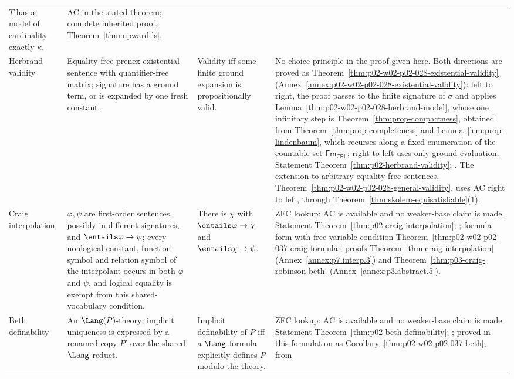 \begin{landscape}
\begin{longtable}{@{}p{1.15in}p{2.15in}p{2.25in}p{1.65in}@{}}
\(T\) has a model of cardinality exactly \(\kappa\). &
AC in the stated theorem; complete inherited proof,
Theorem~\ref{thm:upward-ls}. \\
\addlinespace
Herbrand validity &
Equality-free prenex existential sentence with quantifier-free matrix;
signature has a ground term, or is expanded by one fresh constant. &
Validity iff some finite ground expansion is propositionally valid. &
No choice principle in the proof given here.  Both directions are proved as
Theorem~\ref{thm:p02-w02-p02-028-existential-validity}
(Annex~\ref{annex:p02-w02-p02-028-existential-validity}): left to right, the
proof passes to the finite signature of \(\sigma\) and applies
Lemma~\ref{thm:p02-w02-p02-028-herbrand-model}, whose one infinitary step is
Theorem~\ref{thm:prop-compactness}, obtained from
Theorem~\ref{thm:prop-completeness} and Lemma~\ref{lem:prop-lindenbaum},
which recurses along a fixed enumeration of the countable set
\(\mathsf{Fm}_{\mathsf{CPL}}\); right to left uses only ground evaluation.
Statement Theorem~\ref{thm:p02-herbrand-validity};
\cite{AfshariEnqvistLeigh2025}.  The extension to arbitrary equality-free
sentences, Theorem~\ref{thm:p02-w02-p02-028-general-validity}, uses AC right
to left, through Theorem~\ref{thm:skolem-equisatisfiable}(1). \\
\addlinespace
Craig interpolation &
\(\varphi,\psi\) are first-order sentences, possibly in different
signatures, and \(\entails\varphi\to\psi\); every nonlogical constant,
function symbol and relation symbol of the interpolant occurs in both
\(\varphi\) and \(\psi\), and logical equality is exempt from this
shared-vocabulary condition. &
There is \(\chi\) with \(\entails\varphi\to\chi\) and
\(\entails\chi\to\psi\). &
ZFC lookup: AC is available and no weaker-base claim is made.  Statement
Theorem~\ref{thm:p02-craig-interpolation}; \cite{Craig1957}; formula form
with free-variable condition
Theorem~\ref{thm:p02-w02-p02-037-craig-formula}; proofs
Theorem~\ref{thm:craig-interpolation} (Annex~\ref{annex:p7.interp.3}) and
Theorem~\ref{thm:p03-craig-robinson-beth} (Annex~\ref{annex:p3.abstract.5}). \\
\addlinespace
Beth definability &
An \(\Lang(P)\)-theory; implicit uniqueness is expressed by a renamed
copy \(P'\) over the shared \(\Lang\)-reduct. &
Implicit definability of \(P\) iff a \(\Lang\)-formula explicitly
defines \(P\) modulo the theory. &
ZFC lookup: AC is available and no weaker-base claim is made.  Statement
Theorem~\ref{thm:p02-beth-definability}; \cite{Beth1953}; proved in this
formulation as Corollary~\ref{thm:p02-w02-p02-037-beth}, from

\end{longtable}
\end{landscape}
